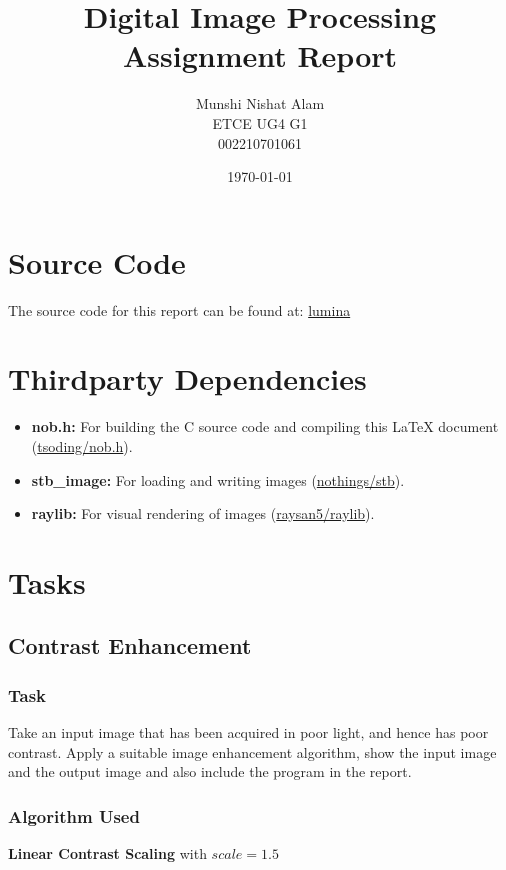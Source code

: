 \documentclass[
    10pt
]{article}
\title{Digital Image Processing Assignment Report}
\date{\today}
\author{
	Munshi Nishat Alam \\
	ETCE UG4 G1        \\
	002210701061
}
\begin{document}
\maketitle
\tableofcontents

\section{Source Code}
The source code for this report can be found at:
\href{https://github.com/mnaetce/lumina}{lumina}

\section{Thirdparty Dependencies}
\begin{itemize}
	\item \textbf{nob.h:}
	      For building the C source code and
	      compiling this \LaTeX{} document
	      (\href{https://github.com/tsoding/nob.h}
	      {tsoding/nob.h}).
	\item \textbf{stb\_image:}
	      For loading and writing images
	      (\href{https://github.com/nothings/stb}
	      {nothings/stb}).
	\item \textbf{raylib:}
	      For visual rendering of images
	      (\href{https://github.com/raysan5/raylib}
	      {raysan5/raylib}).
\end{itemize}

\newpage
\section{Tasks}
\subsection{Contrast Enhancement}
\subsubsection{Task}
Take an input image that has been acquired in poor light, and hence has poor contrast. Apply a suitable image enhancement algorithm, show the input image and the output image and also include the program in the report.

\subsubsection{Algorithm Used}
\textbf{Linear Contrast Scaling} with $scale = 1.5$
\end{document}
